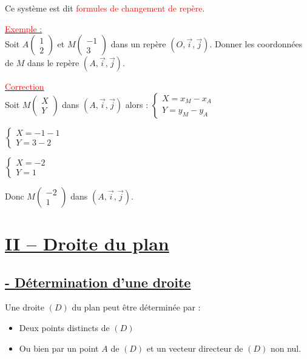 \documentclass[12pt,a4paper]{article}
\begin{document}
Ce système est dit \textcolor{red}{formules de changement de repère}.

\noindent \underline{\textcolor{red}{Exemple :}} \\
Soit $A \begin{pmatrix} 1 \\ 2 \end{pmatrix}$ et $M \begin{pmatrix} -1 \\ 3 \end{pmatrix}$ dans un repère $(O, \vec{i}, \vec{j})$. Donner les coordonnées de $M$ dans le repère $(A, \vec{i}, \vec{j})$.

\noindent \underline{\textcolor{red}{Correction}} \\
Soit $M \begin{pmatrix} X \\ Y \end{pmatrix}$ dans $(A, \vec{i}, \vec{j})$ alors : 
$\begin{cases} X = x_M - x_A \\ Y = y_M - y_A \end{cases}$

$\begin{cases} X = -1 - 1 \\ Y = 3 - 2 \end{cases}$

$\begin{cases} X = -2 \\ Y = 1 \end{cases}$

\noindent Donc $M \begin{pmatrix} -2 \\ 1 \end{pmatrix}$ dans $(A, \vec{i}, \vec{j})$.

\section*{\centering \underline{\color{red}II -- Droite du plan}}
\subsection*{\centering \underline{\color{red}- Détermination d'une droite}}

Une droite $(D)$ du plan peut être déterminée par :
\begin{itemize}
    \item[\textcolor{red}{--}] Deux points distincts de $(D)$
    \item[\textcolor{red}{--}] Ou bien par un point $A$ de $(D)$ et un vecteur directeur de $(D)$ non nul.
\end{itemize}
\end{document}
